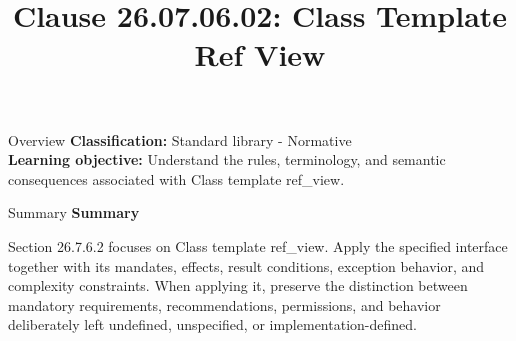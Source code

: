 \documentclass[10pt,letterpaper]{article}
\title{Clause 26.07.06.02: Class Template Ref View}
\author{}
\date{}
\begin{document}
\maketitle
\begin{CornellOverviewBox}{Overview}
\textbf{Classification:} Standard library - Normative\\[2pt]
\textbf{Learning objective:} Understand the rules, terminology, and semantic consequences associated with Class template ref\_view.
\end{CornellOverviewBox}\begin{CornellSummaryBox}{Summary}
{\sffamily\bfseries\color{Accent} Summary}\par\vspace{3pt}Section 26.7.6.2 focuses on Class template ref\_view. Apply the specified interface together with its mandates, effects, result conditions, exception behavior, and complexity constraints. When applying it, preserve the distinction between mandatory requirements, recommendations, permissions, and behavior deliberately left undefined, unspecified, or implementation-defined.
\end{CornellSummaryBox}
\end{document}
